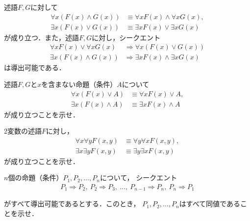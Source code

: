    \begin{thm} \label{thm:genteilandor}
     述語$F,  G$に対して
     \begin{align}
       \forall x (F(x) \land G(x)) & \equiv \forall x F(x) \land \forall x G(x),
       \label{eq:forallland} \\
       \exists x (F(x) \lor G(x)) & \equiv \exists xF(x) \lor \exists xG(x)
       \label{eq:existslor}
     \end{align}
     が成り立つ．また，述語$F,G$に対し，シークエント
     \begin{align}
       \forall x F(x) \lor \forall x G(x) 
       & \Longrightarrow \forall x (F(x) \lor G(x))
       \label{eq:forallor} \\
       \exists x (F(x) \land G(x)) & \Longrightarrow
       \exists x F(x) \land \exists x G(x)
       \label{eq:existsand}
     \end{align}
     は導出可能である．
   \end{thm}
   \begin{que} \label{que:genteilandor}
     述語$F,  G$と$x$を含まない命題（条件）$A$について
     \begin{align}
       \forall x (F(x) \lor A) & \equiv \forall x F(x) \lor A,
       \label{eq:foralllorA} \\
       \exists x (F(x) \land A) & \equiv \exists x F(x) \land A
       \label{eq:existslandA}
     \end{align}
     が成り立つことを示せ．
   \end{que}
   \begin{que} \label{que:genteikoukan}
     2変数の述語$F$に対し，
     \begin{align}
       \forall x \forall y F(x,y) & \equiv \forall y \forall x F(x,y),
       \label{eq:forallkoukan} \\
       \exists x \exists y F(x,y) & \equiv \exists y \exists x F(x,y)
       \label{eq:existskoukan}
     \end{align}
     が成り立つことを示せ．
   \end{que}
   \begin{que} \label{que:circdouti}
     $n$個の命題（条件）$P_1,  P_2,  \ldots ,  P_n$について，
     シークエント
     \begin{align*}
       P_1 \Longrightarrow P_2 , \  P_2 \Longrightarrow P_3  , \  
       \ldots  ,\   P_{n-1} \Longrightarrow P_n  ,\   P_n \Longrightarrow P_1
     \end{align*}
   \end{que}
   がすべて導出可能であるとする．このとき，
   $P_1,  P_2,  \ldots ,  P_n$はすべて同値であることを示せ．
     
